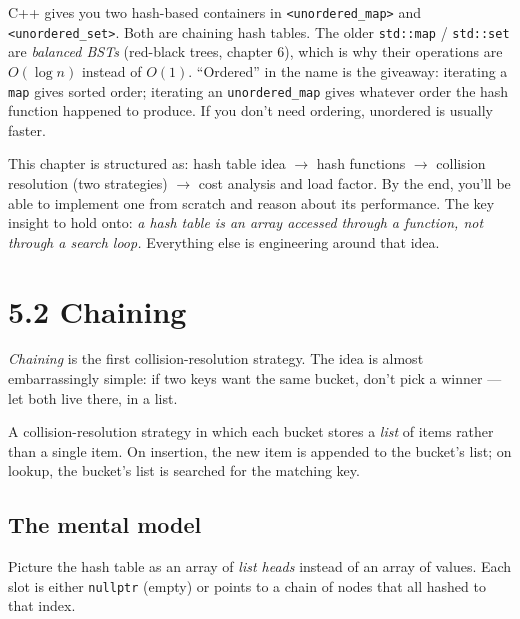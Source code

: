 \documentclass[11pt]{article}
\begin{document}
\begin{notebox}
C++ gives you two hash-based containers in \texttt{<unordered\_map>}
and \texttt{<unordered\_set>}. Both are chaining hash tables. The
older \texttt{std::map} / \texttt{std::set} are \emph{balanced
BSTs} (red-black trees, chapter 6), which is why their operations
are $O(\log n)$ instead of $O(1)$. ``Ordered'' in the name is the
giveaway: iterating a \texttt{map} gives sorted order; iterating
an \texttt{unordered\_map} gives whatever order the hash function
happened to produce. If you don't need ordering, unordered is
usually faster.
\end{notebox}

\begin{ideabox}
This chapter is structured as: hash table idea $\to$ hash
functions $\to$ collision resolution (two strategies) $\to$
cost analysis and load factor. By the end, you'll be able to
implement one from scratch and reason about its performance.
The key insight to hold onto: \emph{a hash table is an array
accessed through a function, not through a search loop.}
Everything else is engineering around that idea.
\end{ideabox}

\section{5.2 Chaining}

\emph{Chaining} is the first collision-resolution strategy. The
idea is almost embarrassingly simple: if two keys want the same
bucket, don't pick a winner --- let both live there, in a list.

\begin{defnbox}[Chaining]
A collision-resolution strategy in which each bucket stores a
\emph{list} of items rather than a single item. On insertion,
the new item is appended to the bucket's list; on lookup, the
bucket's list is searched for the matching key.
\end{defnbox}

\subsection*{The mental model}

Picture the hash table as an array of \emph{list heads} instead
of an array of values. Each slot is either \texttt{nullptr}
(empty) or points to a chain of nodes that all hashed to that
index.
\end{document}
